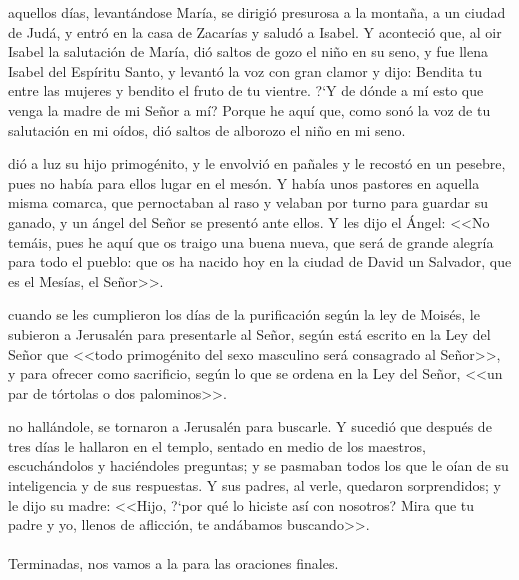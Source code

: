\documentclass[10pt,twoside]{book}
\begin{document}
\vspace{2mm}
aquellos días, levantándose María, se dirigió presurosa a la montaña, a un ciudad de Judá, y entró en la casa de Zacarías y saludó a Isabel.
Y aconteció que, al oir Isabel la salutación de María, dió saltos de gozo el niño en su seno, y fue llena Isabel del Espíritu Santo, y levantó la voz con gran clamor y dijo:
Bendita tu entre las mujeres y bendito el fruto de tu vientre. {?`}Y de dónde a mí esto que venga la madre de mi Señor a mí? Porque he aquí que, como sonó la voz de tu salutación en mi oídos,
dió saltos de alborozo el niño en mi seno.\\[2mm]

\vspace{5mm}

\vspace{2mm}
\space dió a luz su hijo primogénito, y le envolvió en pañales y le recostó en un pesebre, pues no había para ellos lugar en el mesón.
Y había unos pastores en aquella misma comarca, que pernoctaban al raso y velaban por turno para guardar su ganado, y un ángel del Señor se presentó ante ellos.
Y les dijo el Ángel: <<No temáis, pues he aquí que os traigo una buena nueva, que será de grande alegría para todo el pueblo: 
que os ha nacido hoy en la ciudad de David un Salvador, que es el Mesías, el Señor>>.\\[2mm]

\vspace{5mm}

\vspace{2mm}
\space cuando se les cumplieron los días de la purificación según la ley de Moisés, le subieron a Jerusalén para presentarle al Señor,
según está escrito en la Ley del Señor que <<todo primogénito del sexo masculino será consagrado al Señor>>, y para ofrecer como sacrificio,
según lo que se ordena en la Ley del Señor, <<un par de tórtolas o dos palominos>>.\\[2mm]

\vspace{5mm}

\vspace{2mm}
\space no hallándole, se tornaron a Jerusalén para buscarle. Y sucedió que después de tres días le hallaron en el templo,
sentado en medio de los maestros, escuchándolos y haciéndoles preguntas; y se pasmaban todos los que le oían de su inteligencia y de sus respuestas.
Y sus padres, al verle, quedaron sorprendidos; y le dijo su madre: <<Hijo, {?`}por qué lo hiciste así con nosotros? Mira que tu padre y yo, llenos de aflicción, 
te andábamos buscando>>.\\[2mm]
{}\\
Terminadas, nos vamos a la  para las oraciones finales.\\[5mm]
\end{document}
